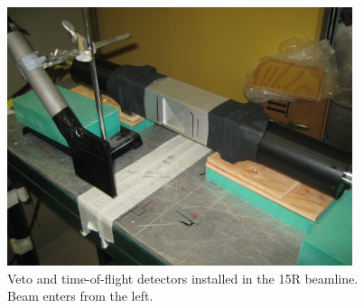 \begin{figure}[ht!]
    \centering
    \includegraphics[width=0.9\textwidth]{figures/VetoAndTOFDetectors.jpg}
    \caption[Veto and time-of-flight detectors installed in the 15R beamline]
    {Veto and time-of-flight detectors installed in the 15R beamline. Beam enters from the left.}
    \label{VetoAndTOFDetectors}
\end{figure}


